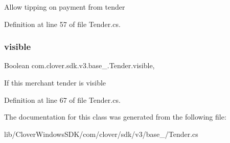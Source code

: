 Allow tipping on payment from tender 



Definition at line 57 of file Tender.\+cs.

\mbox{\label{classcom_1_1clover_1_1sdk_1_1v3_1_1base___1_1_tender_ad1d373010d994888c0fda0e9b4a1f206}} 
\subsubsection{\texorpdfstring{visible}{visible}}
{\footnotesize\ttfamily Boolean com.\+clover.\+sdk.\+v3.\+base\+\_\+.\+Tender.\+visible\hspace{0.3cm}{\ttfamily [get]}, {\ttfamily [set]}}



If this merchant tender is visible 



Definition at line 67 of file Tender.\+cs.



The documentation for this class was generated from the following file\+:\begin{DoxyCompactItemize}
\item 
lib/\+Clover\+Windows\+S\+D\+K/com/clover/sdk/v3/base\+\_\+/Tender.\+cs\end{DoxyCompactItemize}
